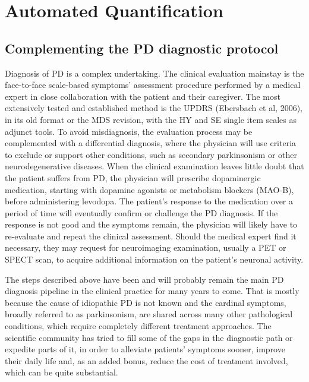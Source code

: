 \chapter{Automated Quantification}
\label{ch:autoQuant}
\pagestyle{fancy}
\fancyhf{}
\fancyhead[OC]{\leftmark}
\fancyhead[EC]{\rightmark}
\cfoot{\thepage}


\section{Complementing the PD diagnostic protocol}
\label{sec:complementing}
Diagnosis of \gls{PD} is a complex undertaking. The clinical evaluation mainstay is the face-to-face scale-based symptoms' assessment procedure performed by a medical expert in close collaboration with the patient and their caregiver. The most extensively tested and established method is the \gls{UPDRS} (Ebersbach et al, 2006), in its old format or the \gls{MDS} revision, with the \gls{HY} and \gls{SE} single item scales as adjunct tools. To avoid misdiagnosis, the evaluation process may be complemented with a differential diagnosis, where the physician will use criteria to exclude or support other conditions, such as secondary parkinsonism or other neurodegenerative diseases. When the clinical examination leaves little doubt that the patient suffers from \gls{PD}, the physician will prescribe dopaminergic medication, starting with dopamine agonists or metabolism blockers (\gls{MAO-B}), before administering levodopa. The patient's response to the medication over a period of time will eventually confirm or challenge the \gls{PD} diagnosis. If the response is not good and the symptoms remain, the physician will likely have to re-evaluate and repeat the clinical assessment. Should the medical expert find it necessary, they may request for neuroimaging examination, usually a \gls{PET} or \gls{SPECT} scan, to acquire additional information on the patient's neuronal activity.

The steps described above have been and will probably remain the main \gls{PD} diagnosis pipeline in the clinical practice for many years to come. That is mostly because the cause of idiopathic \gls{PD} is not known and the cardinal symptoms, broadly referred to as parkinsonism, are shared across many other pathological conditions, which require completely different treatment approaches. The scientific community has tried to fill some of the gaps in the diagnostic path or expedite parts of it, in order to alleviate patients' symptoms sooner, improve their daily life and, as an added bonus, reduce the cost of treatment involved, which can be quite substantial.

